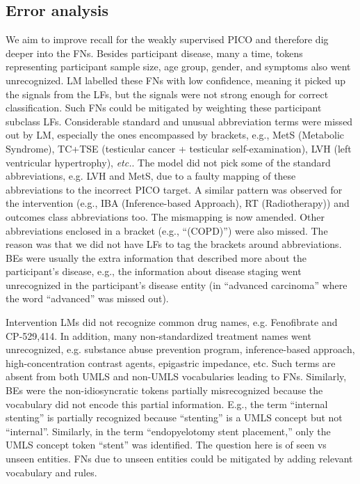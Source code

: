 \documentclass[10.7pt,]{article}
\begin{document}
\subsection{Error analysis}\label{error_an}
%
We aim to improve recall for the weakly supervised PICO and therefore dig deeper into the FNs.
Besides participant disease, many a time, tokens representing participant sample size, age group, gender, and symptoms also went unrecognized.
LM labelled these FNs with low confidence, meaning it picked up the signals from the LFs, but the signals were not strong enough for correct classification. 
Such FNs could be mitigated by weighting these participant subclass LFs.
Considerable standard and unusual abbreviation terms were missed out by LM, especially the ones encompassed by brackets, e.g., MetS (Metabolic Syndrome), TC+TSE (testicular cancer + testicular self-examination), LVH (left ventricular hypertrophy), \textit{etc.}.
The model did not pick some of the standard abbreviations, e.g. LVH and MetS, due to a faulty mapping of these abbreviations to the incorrect PICO target.
A similar pattern was observed for the intervention (e.g., IBA (Inference-based Approach), RT (Radiotherapy)) and outcomes class abbreviations too.
The mismapping is now amended.
Other abbreviations enclosed in a bracket (e.g., ``(COPD)'') were also missed.
The reason was that we did not have LFs to tag the brackets around abbreviations.
BEs were usually the extra information that described more about the participant's disease, e.g., the information about disease staging went unrecognized in the participant's disease entity (in ``advanced carcinoma'' where the word ``advanced'' was missed out).

Intervention LMs did not recognize common drug names, e.g. Fenofibrate and CP-529,414.
In addition, many non-standardized treatment names went unrecognized, e.g. substance abuse prevention program, inference-based approach, high-concentration contrast agents, epigastric impedance, etc.
Such terms are absent from both UMLS and non-UMLS vocabularies leading to FNs.
Similarly, BEs were the non-idiosyncratic tokens partially misrecognized because the vocabulary did not encode this partial information.
E.g., the term ``internal stenting'' is partially recognized because ``stenting'' is a UMLS concept but not ``internal''.
Similarly, in the term ``endopyelotomy stent placement,'' only the UMLS concept token ``stent'' was identified.
The question here is of seen vs unseen entities.
FNs due to unseen entities could be mitigated by adding relevant vocabulary and rules.
\end{document}
